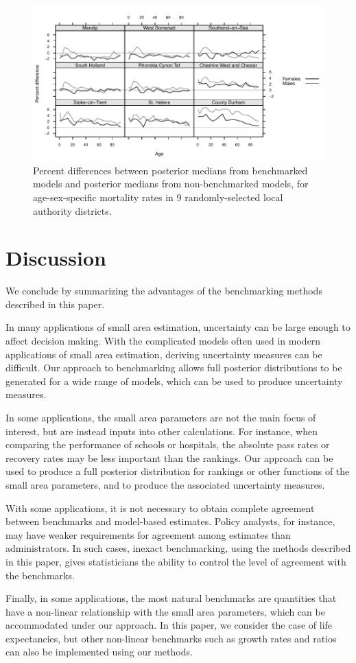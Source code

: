 \documentclass[12pt]{article}
\begin{document}
\begin{figure}
  \center
    \includegraphics{out/mortality/mortality_mx_change}
  \caption{\small Percent differences between posterior medians from benchmarked models and posterior medians from non-benchmarked models, for age-sex-specific mortality rates in 9 randomly-selected local authority districts.}
  \label{fig:mortality_mx_change}
\end{figure}


\section{Discussion}
  \label{sec:discussion}
We conclude by summarizing the advantages of the benchmarking methods described in this paper.

In many applications of small area estimation, uncertainty can be large enough to affect decision making.  With the complicated models often used in
modern applications of small area estimation, deriving uncertainty measures can be difficult. Our approach to benchmarking allows full posterior distributions to be generated for a wide range of models, which can be used to produce uncertainty measures.

In some applications, the small area parameters are not the main focus of interest, but are instead inputs into other calculations. For instance, when comparing the performance of schools or hospitals, the absolute pass rates or recovery rates may be less important than the rankings. Our approach can be used to produce a full posterior distribution for rankings or other functions of the small area parameters, and to produce the associated uncertainty measures.

With some applications, it is not necessary to obtain complete agreement between benchmarks and model-based estimates. Policy analysts, for instance, may have weaker requirements for agreement among estimates than administrators. In such cases, inexact benchmarking, using the methods described in this paper, gives statisticians the ability to control the level of agreement with the benchmarks.

Finally, in some applications, the most natural benchmarks are quantities that have a non-linear relationship with the small area parameters, which can be accommodated under our approach. In this paper, we consider the case of life expectancies, but other non-linear benchmarks such as growth rates and ratios can also be implemented using our methods.




\end{document}
